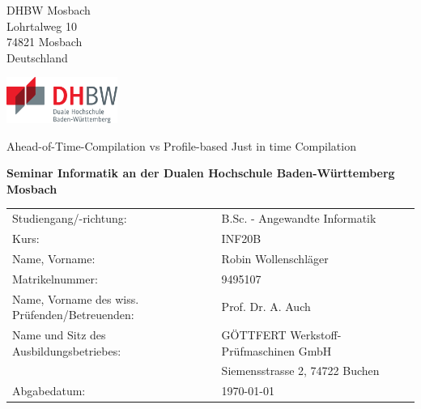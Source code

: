\def\title{Ahead-of-Time-Compilation vs Profile-based Just in time Compilation}
\def\author{Robin Wollenschläger}

\begin{titlepage}


    \begin{minipage}[t]{0.25\textwidth}
        DHBW Mosbach\\
        Lohrtalweg 10\\
        74821 Mosbach\\
        Deutschland
    \end{minipage}
    \hfill
    \begin{minipage}[t]{0.25\textwidth}
        \includegraphics[height=1.5cm]{prefix/image/logo-dhbw.eps}
    \end{minipage}




    \begin{center}
        \vspace{10mm}

        \huge \title

        \vspace{5mm}

        \large \bfseries Seminar Informatik an der Dualen Hochschule Baden-Württemberg Mosbach


    \end{center}

    \vspace{10mm}

    \begin{tabular}[ht]{ l p{4cm} l p{4cm} }
        Studiengang/-richtung:                               & B.Sc. - Angewandte Informatik  \tabularnewline
        Kurs:                                                & INF20B\tabularnewline
        Name, Vorname:                                       & \author \tabularnewline
        Matrikelnummer:                                      & 9495107\tabularnewline
        Name, Vorname des wiss. Prüfenden/Betreuenden:       & Prof. Dr. A. Auch \tabularnewline
        Name und Sitz des Ausbildungsbetriebes:              & GÖTTFERT Werkstoff-Prüfmaschinen GmbH \tabularnewline
                                                             & Siemensstrasse 2, 74722 Buchen \tabularnewline
        Abgabedatum:                                         & \today \tabularnewline
    \end{tabular}


\end{titlepage}
